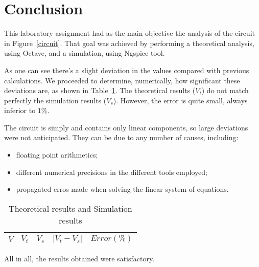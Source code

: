 \section{Conclusion}
\label{sec:conclusion}

This laboratory assignment had as the main objective the analysis of the circuit in Figure~\ref{circuit}. That goal was achieved by performing a theoretical analysis, using Octave, and a simulation, using Ngspice tool.

As one can see there's a slight deviation in the values compared with previous calculations. We proceeded to determine, numerically, how significant these deviations are, as shown in Table~\ref{error_res}. The theoretical results ($V_t$) do not match perfectly the simulation results ($V_s$). However, the error is quite small, always inferior to $1\%$.

The circuit is simply and contains only linear components, so large deviations were not anticipated. They can be due to any number of causes, including:

\begin{itemize}
\item floating point arithmetics;
\item different numerical precisions in the different tools employed;
\item propagated erros made when solving the linear system of equations.
\end{itemize}


\begin{table}[H]
  \centering
  \begin{tabular}{|c|c|c|c|c|}
    \hline
        $V$ & $V_t$ & $V_s$ & $|V_t-V_s|$ & $Error (\%)$ \\
        \hline
        \hline
        
        \hline
  \end{tabular}
  \caption{Theoretical results and Simulation results}
  \label{error_res}
\end{table}


All in all, the results obtained were satisfactory.


